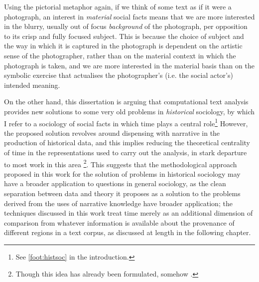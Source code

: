Using the pictorial metaphor again, if we think of some text as if it were a photograph, an interest in \emph{material} social facts means that we are more interested in the blurry, usually out of focus \emph{background} of the photograph, per opposition to its crisp and fully focused subject.
This is because the choice of subject and the way in which it is captured in the photograph is dependent on the artistic sense of the photographer, rather than on the material context in which the photograph is taken, and we are more interested in the material basis than on the symbolic exercise that actualises the photographer's (i.e. the social actor's) intended meaning.

On the other hand, this dissertation is arguing that computational text analysis provides new solutions to some very old problems in \emph{historical} sociology, by which I refer to a sociology of social facts in which time plays a central role\footnote{
    See \autoref{foot:histsoc} in the introduction.
}
However, the proposed solution revolves around dispensing with narrative in the production of historical data, and this implies reducing the theoretical centrality of time in the representations used to carry out the analysis, in stark departure to most work in this area \citep{abbott1990,abbott1992}\footnote{
    \label{foot:abbott}
    Though this idea has already been formulated, somehow \citep{abbott2007}.
}.
This suggests that the methodological approach proposed in this work for the solution of problems in historical sociology may have a broader application to questions in general sociology, as the clean separation between data and theory it proposes as a solution to the problems derived from the uses of narrative knowledge have broader application; the techniques discussed in this work treat time merely as an additional dimension of comparison from whatever information is available about the provenance of different regions in a text corpus, as discussed at length in the following chapter.


